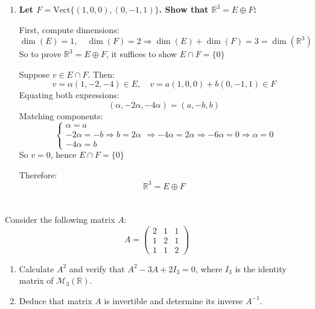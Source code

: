 \documentclass[12pt]{article}
\begin{document}
\begin{answerbox}
\begin{enumerate}
    \item \textbf{Let $ F = \text{Vect}\{(1, 0, 0), (0, -1, 1)\} $. Show that $ \mathbb{R}^3 = E \oplus F $:}
    
    First, compute dimensions:
    $$
    \dim(E) = 1, \quad \dim(F) = 2 \Rightarrow \dim(E) + \dim(F) = 3 = \dim(\mathbb{R}^3)
    $$
    So to prove $ \mathbb{R}^3 = E \oplus F $, it suffices to show $ E \cap F = \{0\} $
    
    Suppose $ v \in E \cap F $. Then:
    $$
    v = \alpha(1, -2, -4) \in E, \quad v = a(1, 0, 0) + b(0, -1, 1) \in F
    $$
    Equating both expressions:
    $$
    (\alpha, -2\alpha, -4\alpha) = (a, -b, b)
    $$
    Matching components:
    $$
    \begin{cases}
    \alpha = a \\
    -2\alpha = -b \Rightarrow b = 2\alpha \\
    -4\alpha = b
    \end{cases}
    \Rightarrow -4\alpha = 2\alpha \Rightarrow -6\alpha = 0 \Rightarrow \alpha = 0
    $$
    So $ v = 0 $, hence $ E \cap F = \{0\} $
    
    Therefore:
    $$
    \boxed{\mathbb{R}^3 = E \oplus F}
    $$
\end{enumerate}
\end{answerbox}

\newpage  
\section{}
Consider the following matrix $A$:
\[
A = \begin{pmatrix}
2 & 1 & 1 \\
1 & 2 & 1 \\
1 & 1 & 2
\end{pmatrix}
\]

\begin{enumerate}
    \item Calculate $A^2$ and verify that $A^2 - 3A + 2I_3 = 0$, where $I_3$ is the identity matrix of $\mathcal{M}_3(\mathbb{R})$.
    \item Deduce that matrix $A$ is invertible and determine its inverse $A^{-1}$.
\end{enumerate}

\newpage
\end{document}
